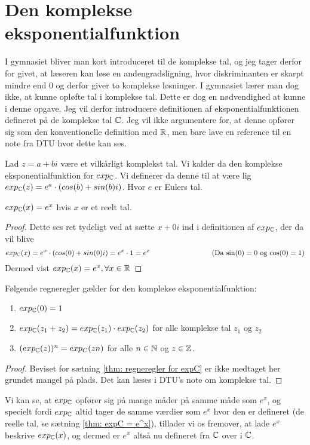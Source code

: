\section{Den komplekse eksponentialfunktion}
I gymnasiet bliver man kort introduceret til de komplekse tal, og jeg tager derfor for givet, at læseren kan løse en andengradsligning, hvor diskriminanten er skarpt mindre end $0$ og derfor giver to komplekse løsninger. 
I gymnasiet lærer man dog ikke, at kunne opløfte tal i komplekse tal. 
Dette er dog en nødvendighed at kunne i denne opgave. 
Jeg vil derfor introducere definitionen af eksponentialfunktionen defineret på de komplekse tal $\mathbb{C}$. 
Jeg vil ikke argumentere for, at denne opfører sig som den konventionelle definition med $\mathbb{R}$, men bare lave en reference til en note fra DTU hvor dette kan ses. 

\begin{definition}\label{def: Den komplekse eksponentialfunktion}

Lad $z=a+bi$ være et vilkårligt komplekst tal. Vi kalder da den komplekse eksponentialfunktion for $exp_{\mathbb{C}}$. 
Vi definerer da denne til at være lig $exp_{\mathbb{C}} (z)=e^{a} \cdot (cos(b) + sin(b)i)$.
Hvor $e$ er Eulers tal. 
\end{definition}

\begin{thm}\label{thm: expC = e^x}
$exp_{\mathbb{C}} (x) = e^x$ hvis $x$ er et reelt tal. 
\end{thm}

\begin{proof}
Dette ses ret tydeligt ved at sætte $x+0i$ ind i definitionen af $exp_{\mathbb{C}}$, der da vil blive $$exp_\mC(x) = e^x \cdot (cos(0)+sin(0)i)=e^x \cdot 1 = e^x \hspace{3cm}
\text{(Da $\sin (0)=0$ og $\cos (0)=1$)}$$
Dermed vist $exp_{\mathbb{C}} (x) = e^x, \forall x \in \mathbb{R}$
\end{proof}

\begin{thm}\label{thm: regneregler for expC}
Følgende regneregler gælder for den komplekse eksponentialfunktion:
\begin{enumerate}
	\item $exp_{\mathbb{C}} (0)=1$
	\item $exp_{\mathbb{C}} (z_1+z_2) = exp_{\mathbb{C}} (z_1) \cdot exp_{\mathbb{C}}(z_2)$ for alle komplekse tal $z_1$ og $z_2$
	\item $(exp_{\mathbb{C}} (z))^n = exp_C (zn)$ for alle $n\in \mathbb{N}$ og $z \in \mathbb{Z}$.
\end{enumerate}
\end{thm}

\begin{proof}
Beviset for sætning \ref{thm: regneregler for expC} er ikke medtaget her grundet mangel på plads. Det kan læses i DTU's note om komplekse tal. 
\end{proof}

Vi kan se, at $exp_{\mathbb{C}}$ opfører sig på mange måder på samme måde som $e^x$, og specielt fordi $exp_{\mathbb{C}}$ altid tager de samme værdier som $e^x$ hvor den er defineret (de reelle tal, se sætning \ref{thm: expC = e^x}), tillader vi os fremover, at lade $e^x$ beskrive $exp_{\mathbb{C}} (x)$, og dermed er $e^x$ altså nu defineret fra $\mathbb{C}$ over i $\mathbb{C}$.